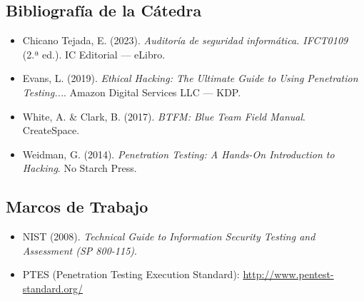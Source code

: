\documentclass[11pt,a4paper]{article}
\begin{document}
\subsection{Bibliografía de la Cátedra}
\begin{itemize}[leftmargin=*]
  \item Chicano Tejada, E. (2023). \textit{Auditoría de seguridad informática. IFCT0109} (2.ª ed.). IC Editorial --- eLibro.
  \item Evans, L. (2019). \textit{Ethical Hacking: The Ultimate Guide to Using Penetration Testing...}. Amazon Digital Services LLC --- KDP.
  \item White, A. \& Clark, B. (2017). \textit{BTFM: Blue Team Field Manual}. CreateSpace.
  \item Weidman, G. (2014). \textit{Penetration Testing: A Hands-On Introduction to Hacking}. No Starch Press.
\end{itemize}

\subsection{Marcos de Trabajo}
\begin{itemize}[leftmargin=*]
  \item NIST (2008). \textit{Technical Guide to Information Security Testing and Assessment (SP 800-115)}.
  \item PTES (Penetration Testing Execution Standard): \url{http://www.pentest-standard.org/}
\end{itemize}
\end{document}
